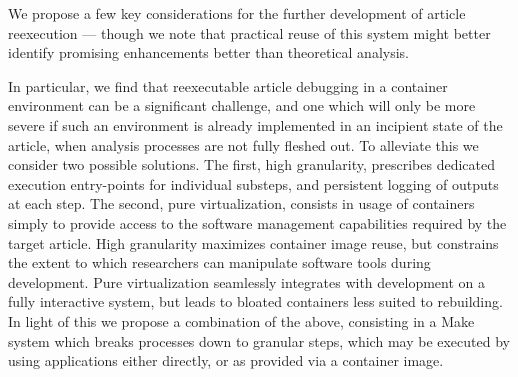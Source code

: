 We propose a few key considerations for the further development of article reexecution — though we note that practical reuse of this system might better identify promising enhancements better than theoretical analysis.

In particular, we find that reexecutable article debugging in a container environment can be a significant challenge, and one which will only be more severe if such an environment is already implemented in an incipient state of the article, when analysis processes are not fully fleshed out.
To alleviate this we consider two possible solutions.
The first, high granularity, prescribes dedicated execution entry-points for individual substeps, and persistent logging of outputs at each step.
The second, pure virtualization, consists in usage of containers simply to provide access to the software management capabilities required by the target article.
High granularity maximizes container image reuse, but constrains the extent to which researchers can manipulate software tools during development.
Pure virtualization seamlessly integrates with development on a fully interactive system, but leads to bloated containers less suited to rebuilding.
In light of this we propose a combination of the above, consisting in a Make system which breaks processes down to granular steps, which may be executed by using applications either directly, or as provided via a container image.


